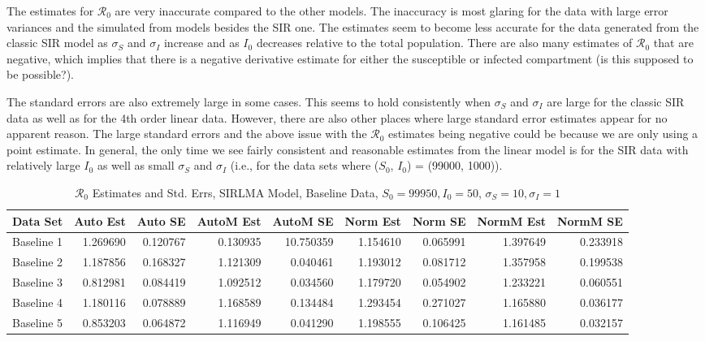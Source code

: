 \documentclass[12pt]{article}
\newcommand{\rr}{\ensuremath{\mathcal{R}_0}}
\begin{document}
The estimates for $\rr$ are very inaccurate compared to the other models. The inaccuracy is most glaring for the data with large error variances and the simulated from models besides the SIR one. The estimates seem to become less accurate for the data generated from the classic SIR model as $\sigma_S$ and $\sigma_I$ increase and as $I_0$ decreases relative to the total population. There are also many estimates of $\rr$ that are negative, which implies that there is a negative derivative estimate for either the susceptible or infected compartment (is this supposed to be possible?). 

The standard errors are also extremely large in some cases. This seems to hold consistently when $\sigma_S$ and $\sigma_I$ are large for the classic SIR data as well as for the 4th order linear data. However, there are also other places where large standard error estimates appear for no apparent reason. The large standard errors and the above issue with the $\rr$ estimates being negative could be because we are only using a point estimate. In general, the only time we see fairly consistent and reasonable estimates from the linear model is for the SIR data with relatively large $I_0$ as well as small $\sigma_S$ and $\sigma_I$ (i.e., for the data sets where ($S_0$, $I_0$) = (99000, 1000)).

\begin{table}[H]
	
	\caption{$\rr$ Estimates and Std. Errs, SIRLMA Model,
		Baseline Data, $S_0 = 99950, I_0 = 50$, 
		$\sigma_S = 10, \sigma_I = 1$}
	\begin{footnotesize}
		\hskip -1cm
	\begin{tabular}{l|r|r|r|r|r|r|r|r}
		\hline
		Data Set & Auto Est & Auto SE & AutoM Est & AutoM SE & Norm Est & Norm SE & NormM Est & NormM SE\\
		\hline
		Baseline 1 & 1.269690 & 0.120767 & 0.130935 & 10.750359 & 1.154610 & 0.065991 & 1.397649 & 0.233918\\
		\hline
		Baseline 2 & 1.187856 & 0.168327 & 1.121309 & 0.040461 & 1.193012 & 0.081712 & 1.357958 & 0.199538\\
		\hline
		Baseline 3 & 0.812981 & 0.084419 & 1.092512 & 0.034560 & 1.179720 & 0.054902 & 1.233221 & 0.060551\\
		\hline
		Baseline 4 & 1.180116 & 0.078889 & 1.168589 & 0.134484 & 1.293454 & 0.271027 & 1.165880 & 0.036177\\
		\hline
		Baseline 5 & 0.853203 & 0.064872 & 1.116949 & 0.041290 & 1.198555 & 0.106425 & 1.161485 & 0.032157\\
		\hline
	\end{tabular}
\end{footnotesize}
\end{table}
\end{document}
